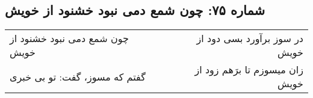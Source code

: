 \begin{center}
\section*{شماره ۷۵: چون شمع دمی نبود خشنود از خویش}
\label{sec:075}
\begin{longtable}{l p{0.5cm} r}
چون شمع دمی نبود خشنود از خویش
&&
در سوز برآورد بسی دود از خویش
\\
گفتم که مسوز، گفت: تو بی خبری
&&
زان میسوزم تا برَهم زود از خویش
\\
\end{longtable}
\end{center}
